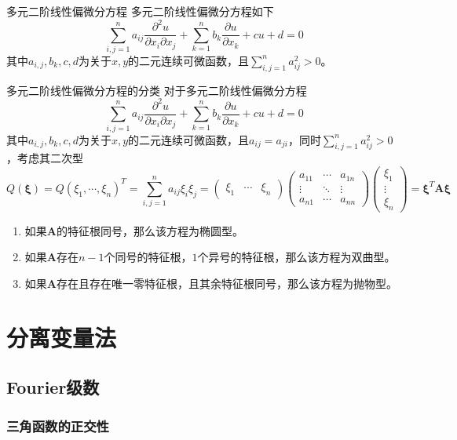 \documentclass[lang = cn, scheme = chinese, thmcnt = section]{elegantbook}
\newcommand{\bs}{\boldsymbol}          %
\begin{document}
\begin{definition}{多元二阶线性偏微分方程}
	多元二阶线性偏微分方程如下
	$$
	\sum_{i,j=1}^{n}a_{ij}\frac{\partial^2 u}{\partial x_i \partial x_j}+\sum_{k=1}^{n}b_k\frac{\partial u}{\partial x_k}+cu+d=0
	$$
	其中$a_{i,j},b_{k},c,d$为关于$x,y$的二元连续可微函数，且$\displaystyle\sum_{i,j=1}^{n}a_{ij}^2>0$。
\end{definition}


\begin{theorem}{多元二阶线性偏微分方程的分类}
	对于多元二阶线性偏微分方程
	$$
	\sum_{i,j=1}^{n}a_{ij}\frac{\partial^2 u}{\partial x_i \partial x_j}+\sum_{k=1}^{n}b_k\frac{\partial u}{\partial x_k}+cu+d=0
	$$
	其中$a_{i,j},b_{k},c,d$为关于$x,y$的二元连续可微函数，且$a_{ij}=a_{ji}$，同时$\displaystyle\sum_{i,j=1}^{n}a_{ij}^2>0$，考虑其二次型
	$$
	Q(\bs{\xi})
	=Q(\xi_1,\cdots,\xi_n)^T
	=\sum_{i,j=1}^{n}a_{ij}\xi_i\xi_j
	=\begin{pmatrix}
		\xi_1 & \cdots & \xi_n
	\end{pmatrix}
	\begin{pmatrix}
		a_{11} & \cdots & a_{1n}\\
		\vdots & \ddots & \vdots\\
		a_{n1} & \cdots & a_{nn}
	\end{pmatrix}
	\begin{pmatrix}
		\xi_1 \\ \vdots \\ \xi_n
	\end{pmatrix}
	=\bs{\xi}^T\bs{A}\bs{\xi}
	$$
	\begin{enumerate}
		\item 如果$\bs{A}$的特征根同号，那么该方程为椭圆型。
		\item 如果$\bs{A}$存在$n-1$个同号的特征根，$1$个异号的特征根，那么该方程为双曲型。
		\item 如果$\bs{A}$存在且存在唯一零特征根，且其余特征根同号，那么该方程为抛物型。
	\end{enumerate}
\end{theorem}

\chapter{分离变量法}

\section{Fourier级数}

\subsection{三角函数的正交性}
\end{document}
